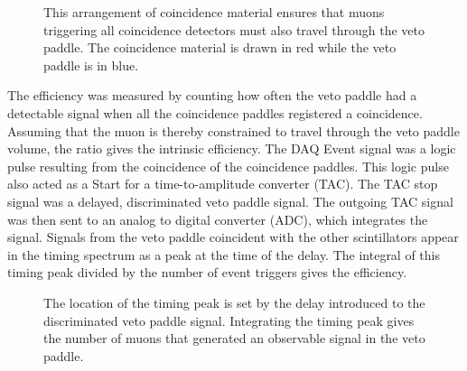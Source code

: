 \begin{figure}[htp]
\caption{This arrangement of coincidence material ensures that muons triggering all coincidence detectors must also travel through the veto paddle.  The coincidence material is drawn in red while the veto paddle is in blue.}
\label{fig:efficiencyTest}
\end{figure}

The efficiency was measured by counting how often the veto paddle had a detectable signal when all the coincidence paddles registered a coincidence.  Assuming that the muon is thereby constrained to travel through the veto paddle volume, the ratio gives the intrinsic efficiency.  The DAQ Event signal was a logic pulse resulting from the coincidence of the coincidence paddles.  This logic pulse also acted as a Start for a time-to-amplitude converter (TAC).  The TAC stop signal was a delayed, discriminated veto paddle signal.  The outgoing TAC signal was then sent to an analog to digital converter (ADC), which integrates the signal.  Signals from the veto paddle coincident with the other scintillators appear in the timing spectrum as a peak at the time of the delay.  The integral of this timing peak divided by the number of event triggers gives the efficiency.
\begin{figure}[htp]
\centering
{}
\caption{The location of the timing peak is set by the delay introduced to the discriminated veto paddle signal.  Integrating the timing peak gives the number of muons that generated an observable signal in the veto paddle.}
\label{fig:vetoTestElectronics}
\end{figure}

